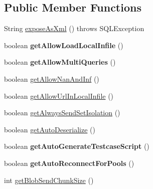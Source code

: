 \subsection*{Public Member Functions}
\begin{DoxyCompactItemize}
\item 
String \mbox{\hyperlink{interfacecom_1_1mysql_1_1jdbc_1_1_connection_properties_a73482b2a70021a34f84dbc38bf1a105a}{expose\+As\+Xml}} ()  throws S\+Q\+L\+Exception
\item 
\mbox{\label{interfacecom_1_1mysql_1_1jdbc_1_1_connection_properties_a06014aca2de919149de5b3cb9a29590b}} 
boolean {\bfseries get\+Allow\+Load\+Local\+Infile} ()
\item 
\mbox{\label{interfacecom_1_1mysql_1_1jdbc_1_1_connection_properties_a30197be21dc0802538205143141a5a0f}} 
boolean {\bfseries get\+Allow\+Multi\+Queries} ()
\item 
boolean \mbox{\hyperlink{interfacecom_1_1mysql_1_1jdbc_1_1_connection_properties_a2da790a00e98b06833dc0856c42d638a}{get\+Allow\+Nan\+And\+Inf}} ()
\item 
boolean \mbox{\hyperlink{interfacecom_1_1mysql_1_1jdbc_1_1_connection_properties_aa0b1ef6e51c18b41376c5651833f11b8}{get\+Allow\+Url\+In\+Local\+Infile}} ()
\item 
boolean \mbox{\hyperlink{interfacecom_1_1mysql_1_1jdbc_1_1_connection_properties_a157a33612cbef9f88801ad8f2a4209b4}{get\+Always\+Send\+Set\+Isolation}} ()
\item 
boolean \mbox{\hyperlink{interfacecom_1_1mysql_1_1jdbc_1_1_connection_properties_aee9fe485d01db5f2c0094702cd16468e}{get\+Auto\+Deserialize}} ()
\item 
\mbox{\label{interfacecom_1_1mysql_1_1jdbc_1_1_connection_properties_a0ad0dfed0851f9cac2a6562ad1d79f55}} 
boolean {\bfseries get\+Auto\+Generate\+Testcase\+Script} ()
\item 
\mbox{\label{interfacecom_1_1mysql_1_1jdbc_1_1_connection_properties_a1f541f5ce5ffb5e0c4e70f520529a2a9}} 
boolean {\bfseries get\+Auto\+Reconnect\+For\+Pools} ()
\item 
int \mbox{\hyperlink{interfacecom_1_1mysql_1_1jdbc_1_1_connection_properties_a722ef2a90bea1ca220340a055850527f}{get\+Blob\+Send\+Chunk\+Size}} ()

\end{DoxyCompactItemize}
